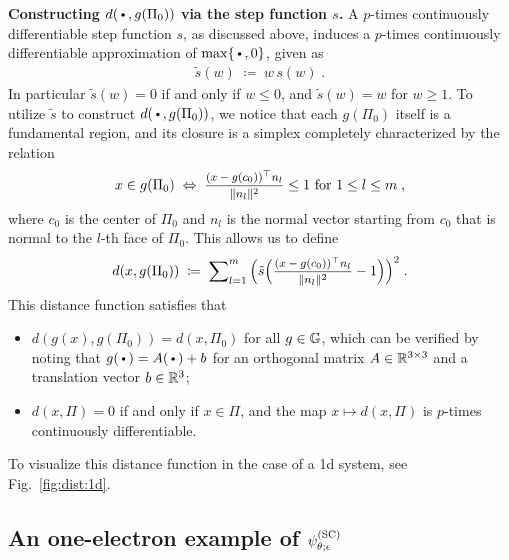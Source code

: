 \textbf{Constructing $d(\argdot, g(\Pi_0))$ via the step function $s$.} A $p$-times continuously differentiable step function $s$, as discussed above, induces a $p$-times continuously differentiable approximation of ${\rm max}\{ \argdot, 0 \}$, given as 
\begin{align*}
    \tilde s(w) \;\coloneqq\; w \, s(w)\;.
\end{align*}
In particular $\tilde s(w) =0 $ if and only if $w \leq 0$, and $\tilde s(w) = w$ for $w \geq 1$. To utilize $\tilde s$ to construct $d(\argdot, g(\Pi_0))$, we notice that each $g(\Pi_0)$ itself is a fundamental region, and its closure is a simplex completely characterized by the relation
\begin{align*}
    x \in g(\Pi_0) \;\Leftrightarrow\; \mfrac{(x - g(c_0))^\top n_l}{\| n_l \|^2} \leq 1 \text{ for } 1 \leq l \leq m \;, 
\end{align*}
where $c_0$ is the center of $\Pi_0$ and $n_l$ is the normal vector starting from $c_0$ that is normal to the $l$-th face of $\Pi_0$. This allows us to define 
\begin{align*}
    d(x, g(\Pi_0)) \;\coloneqq\; 
    \msum_{l=1}^m  
    \Big( 
        \tilde s \Big( \mfrac{(x - g(c_0))^\top n_l}{\| n_l \|^2}  -1 \Big) 
    \Big)^2
    \;.
\end{align*}
This distance function satisfies that 
\begin{itemize}
    \item $ d(g(x), g(\Pi_0)) = d(x, \Pi_0)$ for all $g \in \mathbb{G}$, which can be verified by noting that $g(\argdot) = A(\argdot) + b$ for an orthogonal matrix $A \in \mathbb{R}^{3 \times 3}$ and a translation vector $b \in \mathbb{R}^3$;
    \item $d(x, \Pi) = 0$ if and only if $x \in \Pi$, and the map $x \mapsto d(x,\Pi)$ is $p$-times continuously differentiable. 
\end{itemize}
To visualize this distance function in the case of a 1d system, see Fig.~\ref{fig:dist:1d}.

\subsection{An one-electron example of $\psi^{(\rm SC)}_{\theta;\epsilon}$} \label{appendix:SC:illustration}

